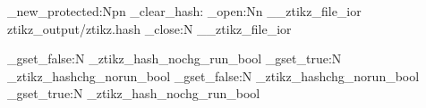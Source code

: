 \cs_new_protected:Npn \ztikz_clear_hash: 
  {
    \iow_open:Nn \g__ztikz_file_ior {ztikz_output/ztikz.hash}
    \ior_close:N \g__ztikz_file_ior
  }


\NewDocumentCommand{\ztikzForceToSkip}{}
  {
    \bool_gset_false:N \g_ztikz_hash_nochg_run_bool
    \bool_gset_true:N \g_ztikz_hashchg_norun_bool
  }
\NewDocumentCommand{\ztikzForceToRun}{}
  {
    \bool_gset_false:N \g_ztikz_hashchg_norun_bool
    \bool_gset_true:N \g_ztikz_hash_nochg_run_bool
  }